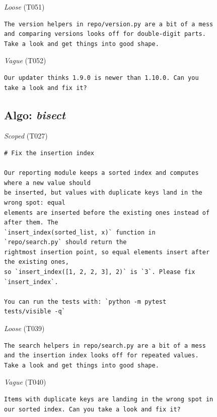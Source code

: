 \noindent\textit{Loose} (T051)
\begin{Verbatim}[fontsize=\scriptsize,frame=leftline,xleftmargin=0.5em]
The version helpers in repo/version.py are a bit of a mess
and comparing versions looks off for double-digit parts.
Take a look and get things into good shape.
\end{Verbatim}

\noindent\textit{Vague} (T052)
\begin{Verbatim}[fontsize=\scriptsize,frame=leftline,xleftmargin=0.5em]
Our updater thinks 1.9.0 is newer than 1.10.0. Can you
take a look and fix it?
\end{Verbatim}

\subsection*{Algo: \emph{bisect}}
\noindent\textit{Scoped} (T027)
\begin{Verbatim}[fontsize=\scriptsize,frame=leftline,xleftmargin=0.5em]
# Fix the insertion index

Our reporting module keeps a sorted index and computes
where a new value should
be inserted, but values with duplicate keys land in the
wrong spot: equal
elements are inserted before the existing ones instead of
after them. The
`insert_index(sorted_list, x)` function in
`repo/search.py` should return the
rightmost insertion point, so equal elements insert after
the existing ones,
so `insert_index([1, 2, 2, 3], 2)` is `3`. Please fix
`insert_index`.

You can run the tests with: `python -m pytest
tests/visible -q`
\end{Verbatim}

\noindent\textit{Loose} (T039)
\begin{Verbatim}[fontsize=\scriptsize,frame=leftline,xleftmargin=0.5em]
The search helpers in repo/search.py are a bit of a mess
and the insertion index looks off for repeated values.
Take a look and get things into good shape.
\end{Verbatim}

\noindent\textit{Vague} (T040)
\begin{Verbatim}[fontsize=\scriptsize,frame=leftline,xleftmargin=0.5em]
Items with duplicate keys are landing in the wrong spot in
our sorted index. Can you take a look and fix it?
\end{Verbatim}

